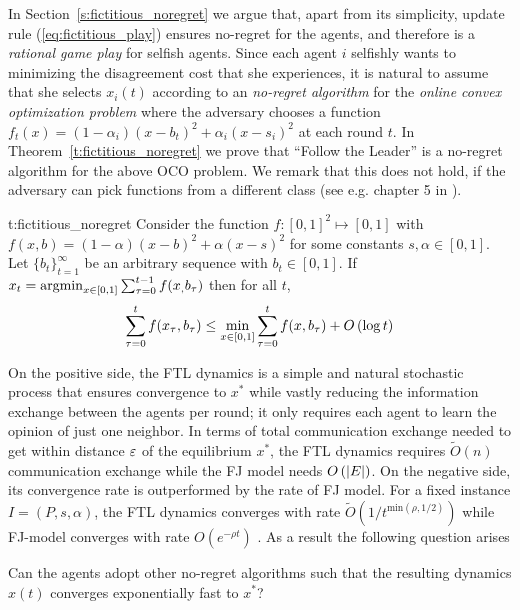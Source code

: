 In Section~\ref{s:fictitious_noregret} we argue that,
apart from its simplicity, update rule (\ref{eq:fictitious_play}) ensures
no-regret for the agents, and therefore is a \emph{rational game play} for selfish agents.
Since each agent $i$ selfishly wants to minimizing the disagreement cost
that she experiences, it is natural to assume that she selects $x_i(t)$ according to
an \emph{no-regret algorithm} for the \emph{online convex optimization problem}
where the adversary chooses a function $f_t(x)=(1-\alpha_i)(x-b_t)^2 + \alpha_i(x-s_i)^2$
at each round $t$. In Theorem~\ref{t:fictitious_noregret}
we prove that \enquote{Follow the Leader} is a no-regret algorithm
for the above OCO problem. We remark that this does not hold,
if the adversary can pick functions from a different class 
(see e.g. chapter 5 in \cite{Haz16}).

\begin{reptheorem}{t:fictitious_noregret}
  Consider the function $f:[0,1]^2 \mapsto [0,1]$ with
  $f(x,b) = (1-\alpha)(x-b)^2 + \alpha(x-s)^2$ for some
  constants $s,\alpha \in [0,1]$.
  Let $\{b_t\}_{t=1}^\infty$ be an arbitrary sequence with
  $b_t \in [0,1]$. If $x_t = \operatorname*{argmin}_{x \in [0,1]}\sum_{\tau=0}^{t-1}f(x_,b_\tau)$
  then for all $t$,
  \[
    \sum_{\tau=0}^{t}f(x_\tau,b_\tau) \leq
    \min_{x \in [0,1]}\sum_{\tau=0}^tf(x,b_\tau) + O\left(\log t\right)
  \]
\end{reptheorem}

On the positive side, the FTL dynamics is a simple and natural
stochastic process that ensures convergence to $x^*$ while 
vastly reducing the information exchange between the agents
per round; it only requires each agent to learn the opinion
of just one neighbor. In terms of total communication exchange 
needed to get within distance $\varepsilon$ of the equilibrium $x^*$, 
the FTL dynamics requires $\widetilde{O}(n)$ communication 
exchange while the FJ model needs $O\left(|E|\right)$.
On the negative side, its convergence rate  
is outperformed by the rate of FJ model. 
For a fixed instance $I=(P,s,\alpha)$, the 
FTL dynamics converges with rate 
$\widetilde{O}(1/t^{\text{min}(\rho,1/2)})$ while FJ-model
converges with rate $O(e^{-\rho t})$ \cite{GS14}.
As a result the following question arises
\begin{question}
  Can the agents adopt other no-regret algorithms such that the resulting
  dynamics $x(t)$ converges exponentially fast to $x^*$?
\end{question}

